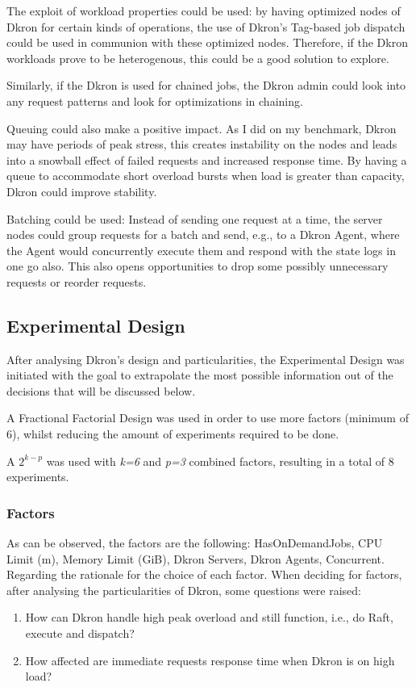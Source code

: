 \documentclass[runningheads]{llncs}
\begin{document}
The exploit of workload properties could be used: by having optimized nodes of Dkron for certain
kinds of operations, the use of Dkron's Tag-based job dispatch could be used in communion with these
optimized nodes. Therefore, if the Dkron workloads prove to be heterogenous, this could be a good
solution to explore.

Similarly, if the Dkron is used for chained jobs, the Dkron admin could look into any request patterns
and look for optimizations in chaining.

Queuing could also make a positive impact. As I did on my benchmark, Dkron may have periods of peak stress,
this creates instability on the nodes and leads into a snowball effect of failed requests and increased
response time. By having a queue to accommodate short overload bursts when load is greater than capacity,
Dkron could improve stability.

Batching could be used: Instead of sending one request at a time, the server nodes could group requests for a batch
and send, e.g., to a Dkron Agent, where the Agent would concurrently execute them and respond with the state logs
in one go also. This also opens opportunities to drop some possibly unnecessary requests or reorder requests.


\subsection{Experimental Design}
After analysing Dkron's design and particularities, the Experimental Design was initiated with the
goal to extrapolate the most possible information out of the decisions that will be discussed below.

A Fractional Factorial Design was used in order to use more factors (minimum of 6), whilst reducing
the amount of experiments required to be done.

A $2^{k-p}$ was used with \textit{k=6} and \textit{p=3} combined factors, resulting
in a total of 8 experiments.

\subsubsection{Factors}

As can be observed, the factors are the following: HasOnDemandJobs, CPU Limit (m),
Memory Limit (GiB), Dkron Servers, Dkron Agents, Concurrent.
Regarding the rationale for the choice of each factor. When deciding for factors,
after analysing the particularities of Dkron, some questions were raised:
\begin{enumerate}
    \item How can Dkron handle high peak overload and still function, i.e., do Raft, execute and
    dispatch?
    \item How affected are immediate requests response time when Dkron is on high load?
\end{enumerate}
\end{document}
